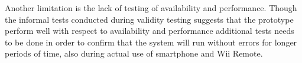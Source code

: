 Another limitation is the lack of testing of availability and performance. Though the informal tests conducted during validity testing suggests that the prototype perform well with respect to availability and performance additional tests needs to be done in order to confirm that the system will run without errors for longer periods of time, also during actual use of smartphone and Wii Remote.